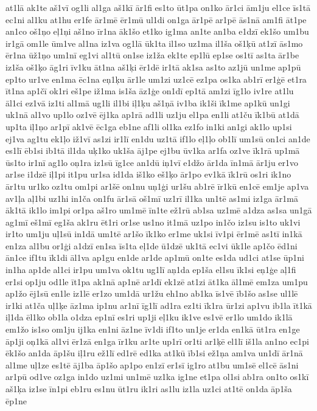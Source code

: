 {at1lā
ak1te
aš1vī
og1li
al1ga
aš1kī
ār1fi
es1to
ūt1pa
on1ko
ār1ci
ām1ju
el1ce
īs1tā
ec1ni
al1ku
at1hu
er1fe
ār1mē
ēr1mū
ul1di
on1ga
ār1pē
ar1pē
ās1nā
am1fi
āt1pe
an1co
oš1ņo
eļ1ņi
aš1no
īr1na
āk1šo
et1ko
ig1ma
an1te
an1ba
e1dzī
ek1šo
um1bu
ir1gā
om1le
ūm1ve
al1na
iz1va
og1lā
ūk1ta
il1so
uz1ma
il1ša
oš1ķū
at1zī
ās1mo
ēr1na
ūž1ņo
um1nī
eg1vi
al1tū
on1se
iz1ža
ek1te
ep1lū
ep1se
os1tī
as1ta
ār1be
iz1ša
oš1ķo
āg1ri
īv1ku
āt1na
aš1ķi
ēr1dē
ir1tā
ak1sa
as1to
az1jū
un1me
ap1pū
ep1to
ur1ve
en1ma
ēc1na
eņ1ķu
ār1le
um1zi
uz1cē
ez1pa
os1ka
ab1rī
er1ģē
et1ra
īt1na
ap1čī
ok1ri
eš1pe
iž1ma
is1ša
āz1ģe
on1dī
ep1tā
am1zi
īg1lo
iv1re
at1lu
āl1ci
ez1vā
iz1ti
al1mā
ug1li
il1bi
iļ1ķu
aš1ņā
iv1ba
ik1ši
īk1me
ap1kū
un1gi
uk1nā
al1vo
up1lo
oz1vē
ēj1ka
ap1rā
ad1li
uz1ju
el1pa
en1li
at1ču
īk1bū
at1dā
up1ta
iļ1ņo
ar1pī
ak1vē
ēc1ga
eb1ne
af1li
ol1ka
ez1fo
in1ki
an1gi
ak1lo
up1si
ej1va
ag1tu
ek1ļo
iž1vī
as1zi
ir1lī
en1du
uz1tā
if1lo
eļ1ļo
ob1lī
um1sū
on1ci
an1de
es1lī
ēb1si
ib1tā
il1da
uķ1ko
uk1ša
āj1pe
ej1bu
ūv1ka
ar1fa
oz1ve
īk1rā
up1mā
ūs1to
ir1nī
ag1lo
oņ1ra
iz1sū
īg1ce
an1dū
iņ1vī
e1džo
ār1da
īn1mā
ār1ju
er1vo
ar1se
i1dzē
iļ1pi
it1pu
ur1sa
id1da
iš1ko
eš1ķo
ār1po
ev1kā
īk1rū
os1ri
ik1no
ār1tu
ur1ko
oz1tu
om1pi
ar1šē
on1nu
uņ1ģi
ur1šu
ab1rē
īr1kū
en1cē
em1je
ap1va
av1ļa
aļ1bi
uz1hi
in1ča
on1fu
ār1sā
oš1mī
uz1rī
il1ka
un1tē
as1mi
iz1ga
ār1mā
āk1tā
ik1lo
im1pi
or1pa
aš1ro
um1mē
īn1te
ež1rū
ab1sa
uz1mē
a1dza
as1sa
un1gā
ag1mī
eš1mī
eg1ša
ak1ru
ēt1ri
or1se
us1no
it1mā
uz1po
in1čo
iz1su
is1to
uk1vi
ir1to
um1ju
uļ1sū
in1dā
um1tē
ar1šo
īk1ko
er1me
uk1si
īv1pi
ēr1mē
as1tī
in1kā
en1za
al1bu
or1ģi
a1dzī
en1sa
īs1ta
eļ1de
ū1dzē
uk1tā
ec1vi
ūk1le
ap1čo
ēd1ni
ān1ce
if1tu
īk1di
āl1va
ap1gu
en1de
ar1de
ap1mū
on1te
es1da
ud1ci
at1se
ūp1ni
in1ha
ap1de
al1ci
ir1pu
um1va
ok1tu
ug1lī
aņ1da
ep1ša
el1su
īk1si
eņ1ģe
aļ1fi
er1si
op1ju
od1le
īt1pa
ak1nā
ap1nē
ar1dī
ek1zē
at1zi
āt1ka
āl1mē
em1za
um1pu
ap1žo
ēj1sū
en1le
iz1lē
er1zo
um1dā
ur1žu
eh1no
ab1ka
īs1vē
īb1šo
as1se
ul1lē
ir1ki
at1ča
uļ1ķe
āz1ma
ip1nu
ar1nī
īg1lī
ad1ra
ez1ti
īk1ra
ūr1zi
ap1vu
ib1la
īt1kā
iļ1da
ēl1ko
ob1la
o1dza
ep1nī
es1ri
up1ji
eļ1ku
ik1ve
es1vē
er1lo
um1do
ik1lā
em1žo
is1so
om1ju
ij1ka
en1ni
āz1ne
īv1di
if1to
un1je
er1da
en1kā
ūt1ra
en1ge
āp1ji
oņ1kā
al1vi
ēr1zā
en1ga
īr1ku
ar1te
up1rī
or1ti
ar1ķē
el1lī
iš1la
an1no
ec1pi
ēk1šo
an1da
āp1šu
iļ1ru
ež1lī
ed1rē
ed1ka
at1kū
īb1si
ež1ņa
am1va
un1dī
ār1nā
al1me
uļ1ze
es1tē
āj1ba
āp1šo
ap1po
en1zī
er1sī
ig1ro
at1bu
um1sē
el1cē
ās1ni
ar1pū
od1ve
oz1ga
in1do
uz1mi
un1mē
uz1ka
ig1ne
et1pa
ol1si
ab1ra
on1to
os1kī
aš1ķa
iz1se
īn1pi
eb1ru
es1nu
ūt1ru
ik1ri
as1lu
iz1la
uz1ci
at1tē
on1da
āp1ša
ēp1ne
}
